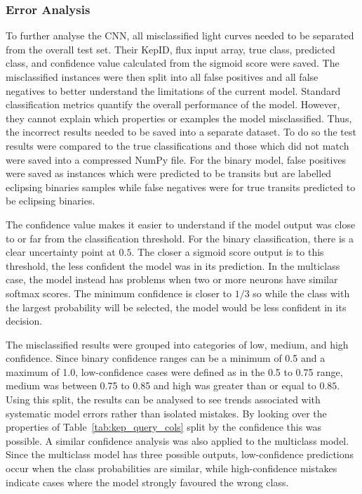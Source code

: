 \subsubsection{Error Analysis}

To further analyse the CNN, all misclassified light curves needed to be separated from the overall test set. Their KepID, flux input array, true class, predicted class, and confidence value calculated from the sigmoid score were saved. The misclassified instances were then split into all false positives and all false negatives to better understand the limitations of the current model. Standard classification metrics quantify the overall performance of the model. However, they cannot explain which properties or examples the model misclassified. Thus, the incorrect results needed to be saved into a separate dataset. To do so the test results were compared to the true classifications and those which did not match were saved into a compressed NumPy file. For the binary model, false positives were saved as instances which were predicted to be transits but are labelled eclipsing binaries samples while false negatives were for true transits predicted to be eclipsing binaries. 

The confidence value makes it easier to understand if the model output was close to or far from the classification threshold. For the binary classification, there is a clear uncertainty point at $0.5$. The closer a sigmoid score output is to this threshold, the less confident the model was in its prediction. In the multiclass case, the model instead has problems when two or more neurons have similar softmax scores. The minimum confidence is closer to $1/3$ so while the class with the largest probability will be selected, the model would be less confident in its decision.

The misclassified results were grouped into categories of low, medium, and high confidence. Since binary confidence ranges can be a minimum of 0.5 and a maximum of 1.0, low-confidence cases were defined as in the 0.5 to 0.75 range, medium was between 0.75 to 0.85 and high was greater than or equal to $0.85$. Using this split, the results can be analysed to see trends associated with systematic model errors rather than isolated mistakes. By looking over the properties of Table~\ref{tab:kep_query_cols} split by the confidence this was possible. A similar confidence analysis was also applied to the multiclass model. Since the multiclass model has three possible outputs, low-confidence predictions occur when the class probabilities are similar, while high-confidence mistakes indicate cases where the model strongly favoured the wrong class.